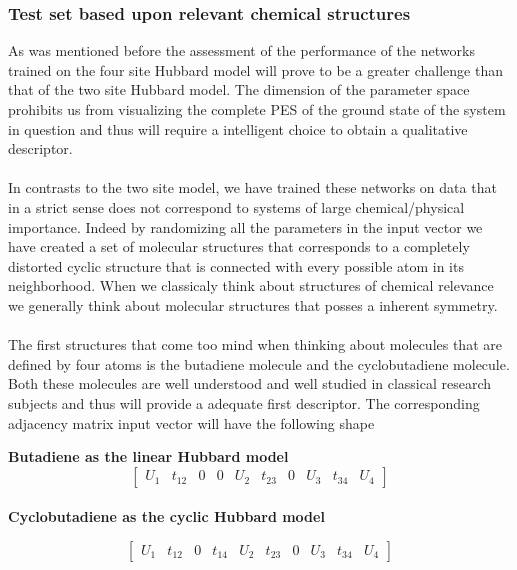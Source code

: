\documentclass[]{article}
\begin{document}
\subsubsection{Test set based upon relevant chemical structures}
 As was mentioned before the assessment of the performance of the networks trained on the four site Hubbard model will prove to be a greater challenge than that of the two site Hubbard model. The dimension of the parameter space prohibits us from visualizing the complete PES of the ground state of the system in question and thus will require a intelligent choice to obtain a qualitative descriptor.
 \\
 \\
 In contrasts to the two site model, we have trained these networks on data that in a strict sense does not correspond to systems of large chemical/physical importance. Indeed by randomizing all the parameters in the input vector we have created a set of molecular structures that corresponds to a completely distorted cyclic structure that is connected with every possible atom in its neighborhood. When we classicaly think about structures of chemical relevance we generally think about molecular structures that posses a inherent symmetry.
 \\
 \\
 The first structures that come too mind when thinking about molecules that are defined by four atoms is the butadiene molecule and the cyclobutadiene molecule. Both these molecules are well understood and well studied in classical research subjects and thus will provide a adequate first descriptor. The corresponding adjacency matrix input vector will have the following shape
 \\
  \begin{center}
  	\textbf{Butadiene as the linear Hubbard model}
 \begin{equation*}
 	\begin{bmatrix}
 		U_1 & t_{12} & 0 & 0 & U_2 & t_{23} & 0 & U_3 & t_{34} & U_4 
 	\end{bmatrix}
 \end{equation*}
 \\
 	\textbf{Cyclobutadiene as the cyclic Hubbard model}
 \end{center}
 \begin{equation*}
 	\begin{bmatrix}
 		U_1 & t_{12} & 0 & t_{14} & U_2 & t_{23} & 0 & U_3 & t_{34} & U_4
 	\end{bmatrix}
 \end{equation*}
\end{document}
